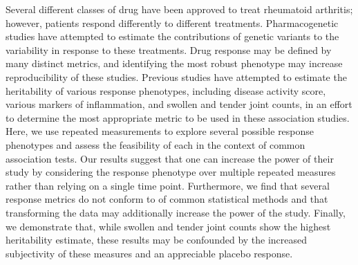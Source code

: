 
Several different classes of drug have been approved to treat rheumatoid arthritis; however, patients respond differently to different treatments. Pharmacogenetic studies have attempted to estimate the contributions of genetic variants to the variability in response to these treatments. Drug response may be defined by many distinct metrics, and identifying the most robust phenotype may increase reproducibility of these studies. Previous studies have attempted to estimate the heritability of various response phenotypes, including disease activity score, various markers of inflammation, and swollen and tender joint counts, in an effort to determine the most appropriate metric to be used in these association studies. Here, we use repeated measurements to explore several possible response phenotypes and assess the feasibility of each in the context of common association tests. Our results suggest that one can increase the power of their study by considering the response phenotype over multiple repeated measures rather than relying on a single time point. Furthermore, we find that several response metrics do not conform to of common statistical methods and that transforming the data may additionally increase the power of the study. Finally, we demonstrate that, while swollen and tender joint counts show the highest heritability estimate, these results may be confounded by the increased subjectivity of these measures and an appreciable placebo response.